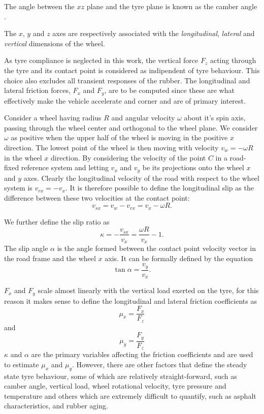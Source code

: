 The angle between the $xz$ plane and the tyre plane is known as the camber angle .

The $x$, $y$ and $z$ axes are respectively associated with the \textit{longitudinal}, \textit{lateral} and \textit{vertical} dimensions of the wheel.

As tyre compliance is neglected in this work, the vertical force $F_z$ acting through the tyre and its contact point is considered as indipendent of tyre behaviour. This choice also excludes all transient responses of the rubber. The longitudinal and lateral friction forces, $F_x$ and $F_y$, are to be computed since these are what effectively make the vehicle accelerate and corner and are of primary interest.

Consider a wheel  having radius $R$ and angular velocity $\omega$ about it's spin axis, passing through the wheel center and orthogonal to the wheel plane.
We consider $\omega$ as positive when the upper half of the wheel is moving in the positive $x$ direction. The lowest point of the wheel is then moving with velocity $v_{w} = -\omega R$ in the wheel $x$ direction.
By considering the velocity of the point $C$ in a road-fixed reference system and letting $v_x$ and $v_y$ be its projections onto the wheel $x$ and $y$ axes.
Clearly the longitudinal velocity of the road with respect to the wheel system is $v_{rx} = - v_x$.
It is therefore possible to define the longitudinal slip as the difference between these two velocities at the contact point:
$$v_{sx} = v_{w} - v_{rx} = v_x - \omega R .$$

We further define the slip ratio as 
$$ \kappa = - \frac{v_{sx}}{v_{x}} = \frac{\omega R}{v_x}-1.$$
The slip angle $\alpha$ is the angle formed between the contact point velocity vector in the road frame and the wheel $x$ axis. It can be formally defined by the equation
$$\tan{\alpha} = \frac{v_y}{v_x}.$$

$F_x$ and $F_y$ scale almost linearly with the vertical load exerted on the tyre, for this reason it makes sense to define the longitudinal and lateral friction coefficients as
$$ \mu_x = \frac{F_x}{F_z}$$
and
$$ \mu_y = \frac{F_y}{F_z}$$
$\kappa$ and $\alpha$ are the primary variables affecting the friction coefficients and are used to estimate $\mu_x$ and $\mu_y$. However, there are other factors that define the steady state tyre behaviour, some of which are relatively straight-forward, such as camber angle, vertical load, wheel rotational velocity, tyre pressure and temperature and others which are extremely difficult to quantify, such as asphalt characteristics, and rubber aging.

